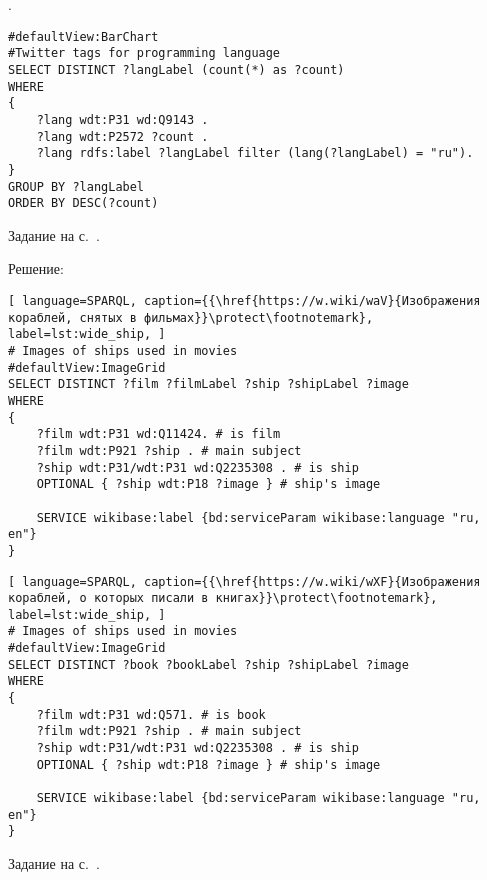 \begin{task}
    \label{answer:prog_langs_6}
    . 
	\begin{lstlisting}[language=SPARQL, caption={{\href{https://w.wiki/v4h}{Хештеги языков программирования в Твиттере}}\protect\footnotemark}, label=lst:prog_lang_answer_6]
#defaultView:BarChart
#Twitter tags for programming language
SELECT DISTINCT ?langLabel (count(*) as ?count)
WHERE
{
    ?lang wdt:P31 wd:Q9143 .
    ?lang wdt:P2572 ?count .
    ?lang rdfs:label ?langLabel filter (lang(?langLabel) = "ru"). 
} 
GROUP BY ?langLabel
ORDER BY DESC(?count)
	\end{lstlisting}
    
    \small{Задание на с.~\pageref{prog_lang_test}.}
\end{task}




\begin{task}
	\label{answer:ship_1}
	Решение:
	\begin{lstlisting}[ language=SPARQL, caption={{\href{https://w.wiki/waV}{Изображения кораблей, снятых в фильмах}}\protect\footnotemark}, label=lst:wide_ship, ]
# Images of ships used in movies
#defaultView:ImageGrid
SELECT DISTINCT ?film ?filmLabel ?ship ?shipLabel ?image
WHERE
{
	?film wdt:P31 wd:Q11424. # is film	
	?film wdt:P921 ?ship . # main subject
	?ship wdt:P31/wdt:P31 wd:Q2235308 . # is ship
	OPTIONAL { ?ship wdt:P18 ?image } # ship's image
								
	SERVICE wikibase:label {bd:serviceParam wikibase:language "ru, en"}
}
	\end{lstlisting}

	\begin{lstlisting}[ language=SPARQL, caption={{\href{https://w.wiki/wXF}{Изображения кораблей, о которых писали в книгах}}\protect\footnotemark}, label=lst:wide_ship, ]
# Images of ships used in movies
#defaultView:ImageGrid
SELECT DISTINCT ?book ?bookLabel ?ship ?shipLabel ?image
WHERE
{
	?film wdt:P31 wd:Q571. # is book	
	?film wdt:P921 ?ship . # main subject
	?ship wdt:P31/wdt:P31 wd:Q2235308 . # is ship
	OPTIONAL { ?ship wdt:P18 ?image } # ship's image
									
	SERVICE wikibase:label {bd:serviceParam wikibase:language "ru, en"}
}
	\end{lstlisting}
	
\small{Задание на с.~\pageref{question:ship_1}.}
\end{task}



